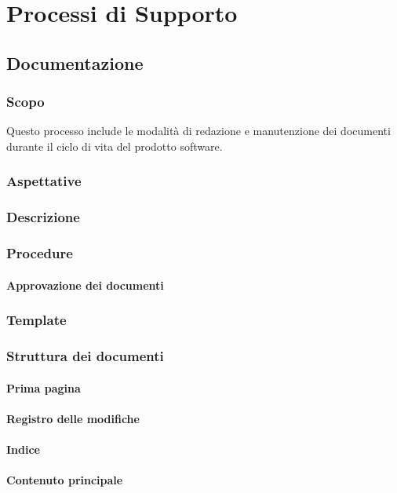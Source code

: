 \section{Processi di Supporto}


\subsection{Documentazione}

	\subsubsection{Scopo}
	Questo processo include le modalità di redazione e manutenzione dei documenti durante il ciclo di vita del prodotto software.
	
	\subsubsection{Aspettative}
	
	
	\subsubsection{Descrizione}
	\subsubsection{Procedure}
		\paragraph{Approvazione dei documenti}
	\subsubsection{Template}
	\subsubsection{Struttura dei documenti}
		\paragraph{Prima pagina}
		\paragraph{Registro delle modifiche}
		\paragraph{Indice}
		\paragraph{Contenuto principale}
